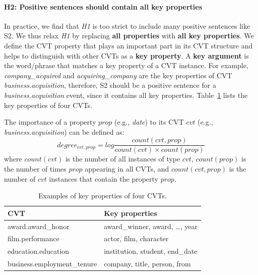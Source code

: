 
\paragraph{H2: Positive sentences should contain all key properties}
In practice, we find that \emph{H1} is too strict to include many positive sentences like S2.
We thus relax \emph{H1} by replacing \textbf{all properties} with \textbf{all key properties}. We define the CVT property that plays an important part in its CVT structure and helps to distinguish with other CVTs as a \textbf{key property}. A \textbf{key argument} is the word/phrase that matches a key property of a CVT instance. For example, \emph{company\_acquired} and \emph{acquiring\_company} are the key properties of CVT \emph{business.acquisition}, therefore,  S2 should be a positive sentence for a \emph{business.acquisition} event, since it contains all key properties. Table~\ref{tab:5} lists the key properties of four CVTs.

The importance of a property $prop$ (e.g., \emph{date}) to its CVT $cvt$ (e.g., \emph{business.acquisition}) can be defined as:
\begin{equation}
	degree_{cvt, prop} = log \frac{count(cvt, prop)}{count(cvt) \times count(prop)}
\end{equation}
where $count(cvt)$ is the number of all instances of type $cvt$, $count(prop)$ is the number of times $prop$ appearing in all CVTs, and $count(cvt, prop)$ is the number of $cvt$ instances that contain the property $prop$.

\begin{table}
\centering
\small
\begin{tabular}{|l|l|} \hline
CVT & Key properties \\ \hline
award.award\_honor & award\_winner, award, \ldots, year \\ \hline
film.performance & actor, film, character \\ \hline
education.education & institution, student, end\_date \\ \hline
business.employment\_tenure & company, title, person, from \\ \hline
\end{tabular}
\caption{Examples of key properties of four CVTs.\label{tab:5}}
\end{table}

